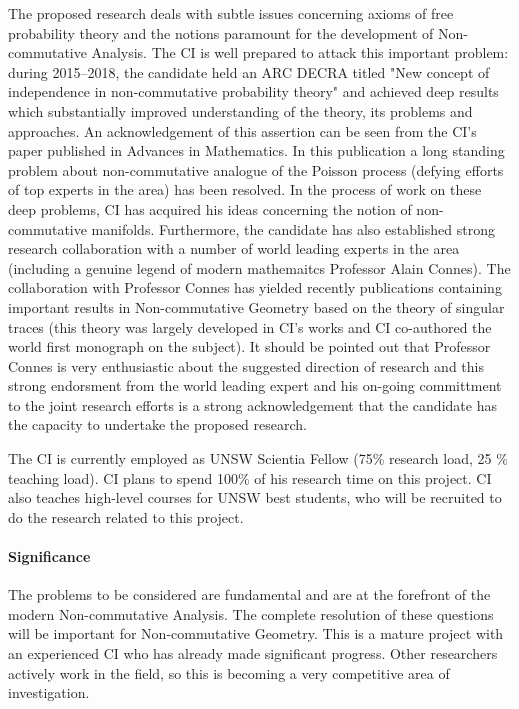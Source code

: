 \documentclass{article}
\newcommand{\archeading}[1]{\vspace{.3cm} \noindent{\bfseries #1} \vspace{.1cm}   }
\begin{document}
The proposed research deals with subtle issues concerning axioms of free probability theory and the notions
paramount for the development of Non-commutative Analysis. The CI is well prepared to attack this important problem: during 2015--2018, the candidate held an ARC DECRA titled "New concept of independence in non-commutative probability theory" and achieved deep results which substantially improved understanding of the theory, its problems and approaches. An acknowledgement of this assertion can be seen from the CI's paper \cite{JSZ_advances} published in Advances in Mathematics. In this publication a long standing problem about non-commutative analogue of the Poisson process (defying efforts of top experts in the area) has been resolved. In the process of work on these deep problems, CI has acquired his ideas concerning the notion of non-commutative manifolds. Furthermore,
the candidate has also established strong research collaboration with a number of world leading experts in the area (including a genuine legend of modern mathemaitcs Professor Alain Connes). The collaboration with Professor Connes has yielded recently publications \cite{Connes_team} containing important results in Non-commutative Geometry based on the theory of singular traces (this theory was largely developed in CI's works and CI co-authored the world first monograph \cite{book} on the subject). It should be pointed out that Professor Connes is very enthusiastic about the suggested direction of research
and this strong endorsment from the world leading expert and his on-going committment to the joint research efforts is a strong acknowledgement that the candidate has the capacity to undertake the proposed research.

The CI is currently employed as UNSW Scientia Fellow (75\% research load, 25 \% teaching load). CI plans to spend 100\% of his research time on this project. CI also teaches high-level courses for UNSW best students, who will be recruited to do the research related to this project.

\bigskip\archeading{Project quality and innovation}

\paragraph*{Significance} The problems to be considered are fundamental and are at the forefront of the modern Non-commutative Analysis. The complete resolution of these questions will be important for Non-commutative Geometry. This is a mature project with an experienced CI who has already made significant progress. Other researchers actively work in the field, so this is becoming a very competitive area of investigation.
\end{document}
